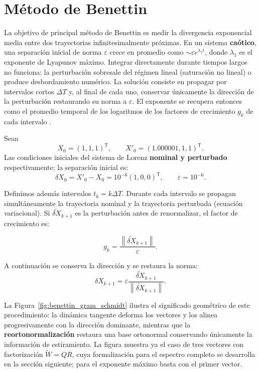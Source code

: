 \documentclass[12pt,a4paper,oneside]{report}
\theoremstyle{definition}
\numberwithin{equation}{chapter}
\newcommand{\norm}[1]{\left\lVert #1\right\rVert}
\newcommand{\trans}{\mathsf{T}}
\begin{document}
\chapter{Método de Benettin}

La objetivo de principal método de Benettin es medir la divergencia
exponencial media entre dos trayectorias infinitesimalmente próximas.
En un sistema \textbf{caótico}, una separación inicial de norma $\varepsilon$
crece en promedio como $\sim\varepsilon e^{\lambda_1 t}$, donde
$\lambda_1$ es el exponente de Lyapunov máximo. Integrar directamente
durante tiempos largos no funciona: la perturbación sobresale del régimen
lineal (saturación no lineal) o produce desbordamiento numérico. La
solución consiste en propagar por intervalos cortos $\Delta T$ y, al final de
cada uno, conservar únicamente la dirección de la perturbación
restaurando su norma a $\varepsilon$. El exponente se recupera entonces
como el promedio temporal de los logaritmos de los factores de
crecimiento $g_k$ de cada intervalo \cite{benettin1980}.

Sean
\[
    X_0=(1,1,1)^{\trans},\qquad X'_0=(1.000001,1,1)^{\trans}.
\]
Las condiciones iniciales del sistema de Lorenz \textbf{nominal y perturbado} respectivamente; la separación inicial es:
\begin{equation}
    \delta X_0=X'_0-X_0 =10^{-6}(1,0,0)^{\trans}, \qquad \varepsilon=10^{-6}.
\end{equation}

Definimos además intervalos \(t_k=k\Delta T\). Durante cada intervalo se propagan simultáneamente la trayectoria nominal y la trayectoria perturbada (ecuación variacional). Si \(\widetilde{\delta X}_{k+1}\) es la perturbación antes de renormalizar, el factor de crecimiento es:

\begin{equation}
    g_k=\frac{\norm{\widetilde{\delta X}_{k+1}}}{\varepsilon}.
\end{equation}

A continuación se conserva la dirección y se restaura la norma:
\begin{equation}
    \delta X_{k+1} = \varepsilon \frac{\widetilde{\delta X}_{k+1}} {\norm{\widetilde{\delta X}_{k+1}}}.
\end{equation}

La Figura~\ref{fig:benettin_gram_schmidt} ilustra el significado
geométrico de este procedimiento: la dinámica tangente deforma los
vectores y los alinea progresivamente con la dirección dominante,
mientras que la \textbf{reortonormalización} restaura una base ortonormal
conservando únicamente la información de estiramiento. La figura
muestra ya el caso de tres vectores con factorización
$\widetilde W = QR$, cuya formalización para el espectro completo se
desarrolla en la sección siguiente; para el exponente máximo basta
con el primer vector.
\end{document}
